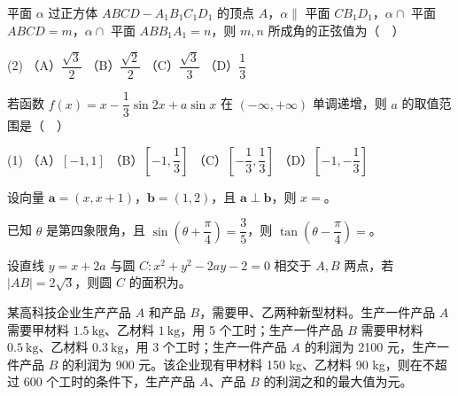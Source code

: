 \begin{question}
平面 \(\alpha\) 过正方体 \(ABCD-A_1B_1C_1D_1\) 的顶点 \(A\)，\(\alpha\parallel\) 平面 \(CB_1D_1\)，\(\alpha\cap\) 平面 \(ABCD=m\)，\(\alpha\cap\) 平面 \(ABB_1A_1=n\)，则 \(m,n\) 所成角的正弦值为（　）

\begin{gkopts}(2)
\task （A）\(\dfrac{\sqrt{3}}{2}\)
\task （B）\(\dfrac{\sqrt{2}}{2}\)
\task （C）\(\dfrac{\sqrt{3}}{3}\)
\task （D）\(\dfrac{1}{3}\)
\end{gkopts}

\end{question}
\begin{question}
若函数 \(f(x)=x-\dfrac{1}{3}\sin 2x+a\sin x\) 在 \(( -\infty,+\infty )\) 单调递增，则 \(a\) 的取值范围是（　）

\begin{gkopts}(1)
\task （A）\([-1,1]\)
\task （B）\([-1,\dfrac{1}{3}]\)
\task （C）\([-\dfrac{1}{3},\dfrac{1}{3}]\)
\task （D）\([-1,-\dfrac{1}{3}]\)
\end{gkopts}

\end{question}

\begin{question}
设向量 \(\boldsymbol{a}=(x,x+1)\)，\(\boldsymbol{b}=(1,2)\)，且 \(\boldsymbol{a}\perp\boldsymbol{b}\)，则 \(x=\)\gkblank{}。

\end{question}
\begin{question}
已知 \(\theta\) 是第四象限角，且 \(\sin\left(\theta+\dfrac{\pi}{4}\right)=\dfrac{3}{5}\)，则 \(\tan\left(\theta-\dfrac{\pi}{4}\right)=\)\gkblank{}。

\end{question}
\begin{question}
设直线 \(y=x+2a\) 与圆 \(C:x^2+y^2-2ay-2=0\) 相交于 \(A,B\) 两点，若 \(|AB|=2\sqrt{3}\)，则圆 \(C\) 的面积为\gkblank{}。

\end{question}
\begin{question}
某高科技企业生产产品 \(A\) 和产品 \(B\)，需要甲、乙两种新型材料。生产一件产品 \(A\) 需要甲材料 \(1.5\ \mathrm{kg}\)、乙材料 \(1\ \mathrm{kg}\)，用 5 个工时；生产一件产品 \(B\) 需要甲材料 \(0.5\ \mathrm{kg}\)、乙材料 \(0.3\ \mathrm{kg}\)，用 3 个工时；生产一件产品 \(A\) 的利润为 2100 元，生产一件产品 \(B\) 的利润为 900 元。该企业现有甲材料 150 kg、乙材料 90 kg，则在不超过 600 个工时的条件下，生产产品 \(A\)、产品 \(B\) 的利润之和的最大值为\gkblank{}元。

\end{question}

